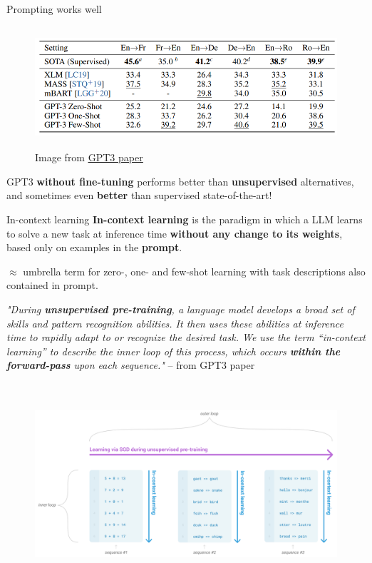 \documentclass[12pt,aspectratio=169,handout]{beamer}
\begin{document}
\begin{frame}{Prompting works well}
	\begin{figure}[h]
		\includegraphics[height=4.5cm]{gpt3-translation-results}
		\caption*{Image from \href{https://arxiv.org/pdf/2005.14165.pdf}{\underline{GPT3 paper}}}
	\end{figure}
	GPT3 \textbf{without fine-tuning} performs better than \textbf{unsupervised} alternatives, and sometimes even \textbf{better} than supervised state-of-the-art!
\end{frame}

\begin{frame}{In-context learning}
	\textbf{In-context learning} is the paradigm in which a LLM learns to solve a new task at inference time \textbf{without any change to its weights}, based only on examples in the \textbf{prompt}.
	\pause

	\hspace{1em}$\approx$ umbrella term for zero-, one- and few-shot learning with task descriptions also contained in prompt.
	\vspace{1em}

	\pause
	\textit{"During \textbf{unsupervised pre-training}, a language model develops a broad set of skills and pattern recognition abilities. It then uses these abilities at inference time to rapidly adapt to or recognize the desired task. We use the term “in-context learning” to describe the inner loop of this process, which occurs \textbf{within the forward-pass} upon each sequence."} -- from GPT3 paper

\end{frame}

\begin{frame}%
	\begin{figure}[h]
		\includegraphics[height=7.5cm]{in-context-learning}
	\end{figure}

\end{frame}
\end{document}

